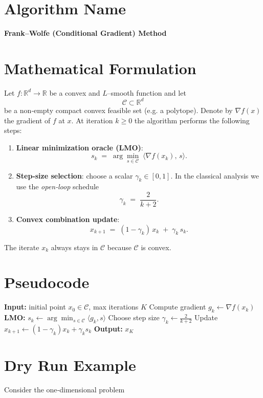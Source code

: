 \documentclass{article}
\begin{document}
\section*{Algorithm Name}
\textbf{Frank–Wolfe (Conditional Gradient) Method}

\section*{Mathematical Formulation}
Let $f:\mathbb{R}^d\rightarrow\mathbb{R}$ be a convex and $L$–smooth function and let 
\[
\mathcal{C}\subset\mathbb{R}^d
\]
be a non‑empty compact convex feasible set (e.g. a polytope).  
Denote by $\nabla f(x)$ the gradient of $f$ at $x$.  
At iteration $k\ge 0$ the algorithm performs the following steps:

\begin{enumerate}
    \item \textbf{Linear minimization oracle (LMO)}: 
    \[
    s_k\;=\;\arg\min_{s\in\mathcal{C}}\;\langle \nabla f(x_k),\,s\rangle .
    \tag{1}
    \]
    \item \textbf{Step‑size selection}: choose a scalar $\gamma_k\in[0,1]$.  
    In the classical analysis we use the \emph{open‑loop} schedule
    \[
    \gamma_k \;=\; \frac{2}{k+2}.
    \tag{2}
    \]
    \item \textbf{Convex combination update}:
    \[
    x_{k+1}\;=\;(1-\gamma_k)\,x_k\;+\;\gamma_k\,s_k .
    \tag{3}
    \]
\end{enumerate}
The iterate $x_k$ always stays in $\mathcal{C}$ because $\mathcal{C}$ is convex.

\section*{Pseudocode}
\begin{algorithm}[H]
\caption{Frank–Wolfe Method}
\begin{algorithmic}[1]
\State \textbf{Input:} initial point $x_0\in\mathcal{C}$, max iterations $K$
    \State Compute gradient $g_k \gets \nabla f(x_k)$
    \State \textbf{LMO:} $s_k \gets \arg\min_{s\in\mathcal{C}}\langle g_k,s\rangle$
    \State Choose step size $\displaystyle \gamma_k \gets \frac{2}{k+2}$
    \State Update $x_{k+1} \gets (1-\gamma_k)x_k + \gamma_k s_k$
\EndFor
\State \textbf{Output:} $x_K$
\end{algorithmic}
\end{algorithm}

\section*{Dry Run Example}
Consider the one‑dimensional problem  
\end{document}
